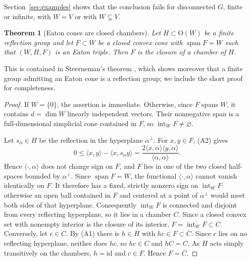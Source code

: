 \documentclass[11pt]{amsart}
\theoremstyle{plain}
\newtheorem{theorem}{Theorem}[section]
\theoremstyle{definition}
\theoremstyle{remark}
\newcommand{\ip}[2]{\langle #1,#2\rangle}
\newcommand{\spn}{\operatorname{span}}
\begin{document}
Section~\ref{sec:examples} shows that the conclusion fails for disconnected $G$, finite or infinite, with $W=V$ or with $W\subsetneq V$.

\begin{theorem}[Eaton cones are closed chambers]\label{thm:chamber}
Let $H\subset \mathrm{O}(W)$ be a finite reflection group and let $F\subset W$ be a closed convex cone with $\spn F=W$ such that $(W,H,F)$ is an Eaton triple. Then $F$ is the closure of a chamber of $H$.
\end{theorem}

This is contained in Steerneman's theorem \cite[Theorem 4.1]{Steerneman}, which shows moreover that a finite group admitting an Eaton cone is a reflection group; we include the short proof for completeness.

\begin{proof}
If $W=\{0\}$, the assertion is immediate. Otherwise, since $F$ spans $W$, it contains $d=\dim W$ linearly independent vectors. Their nonnegative span is a full-dimensional simplicial cone contained in $F$, so $\operatorname{int}_W F\neq\varnothing$.

Let $s_\alpha\in H$ be the reflection in the hyperplane $\alpha^\perp$. For $x,y\in F$, (A2) gives
\[
0\le\ip{x}{y}-\ip{x}{s_\alpha y}=\frac{2\ip{x}{\alpha}\ip{y}{\alpha}}{\ip{\alpha}{\alpha}}.
\]
Hence $\ip{\cdot}{\alpha}$ does not change sign on $F$, and $F$ lies in one of the two closed half-spaces bounded by $\alpha^\perp$. Since $\spn F=W$, the functional $\ip{\cdot}{\alpha}$ cannot vanish identically on $F$. It therefore has a fixed, strictly nonzero sign on $\operatorname{int}_W F$: otherwise an open ball contained in $F$ and centered at a point of $\alpha^\perp$ would meet both sides of that hyperplane. Consequently $\operatorname{int}_W F$ is connected and disjoint from every reflecting hyperplane, so it lies in a chamber $C$. Since a closed convex set with nonempty interior is the closure of its interior, $F=\overline{\operatorname{int}_W F}\subset\overline C$. Conversely, let $c\in C$. By (A1) there is $h\in H$ with $hc\in F\subset\overline C$. Since $c$ lies on no reflecting hyperplane, neither does $hc$, so $hc\in C$ and $hC=C$. As $H$ acts simply transitively on the chambers, $h=\mathrm{id}$ and $c\in F$. Hence $F=\overline C$.
\end{proof}
\end{document}
